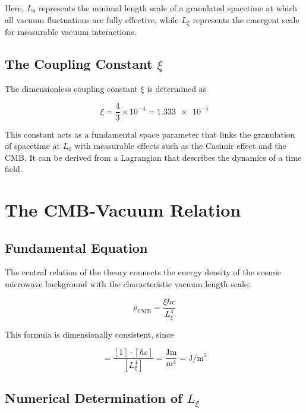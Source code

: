 	Here, \( L_0 \) represents the minimal length scale of a granulated spacetime at which all vacuum fluctuations are fully effective, while \( L_\xi \) represents the emergent scale for measurable vacuum interactions.
	
	\subsection{The Coupling Constant \( \xi \)}
	
	The dimensionless coupling constant \( \xi \) is determined as
	
	\begin{equation}
		\xi = \frac{4}{3} \times 10^{-4} = \num{1.333e-4} \label{eq:coupling_constant}
	\end{equation}
	
	This constant acts as a fundamental space parameter that links the granulation of spacetime at \( L_0 \) with measurable effects such as the Casimir effect and the CMB. It can be derived from a Lagrangian that describes the dynamics of a time field.
	
	\section{The CMB-Vacuum Relation}
	
	\subsection{Fundamental Equation}
	
	The central relation of the theory connects the energy density of the cosmic microwave background with the characteristic vacuum length scale:
	
	\begin{equation}
		\rho_{\text{CMB}} = \frac{\xi \hbar c}{L_\xi^4} \label{eq:cmb_vacuum_relation}
	\end{equation}
	
	This formula is dimensionally consistent, since
	
	\begin{equation}
		[\rho_{\text{CMB}}] = \frac{[1] \cdot [\hbar c]}{[L_\xi^4]} = \frac{\si{\joule\meter}}{\si{\meter^4}} = \si{\joule\per\meter^3}
	\end{equation}
	
	\subsection{Numerical Determination of \( L_\xi \)}
	
